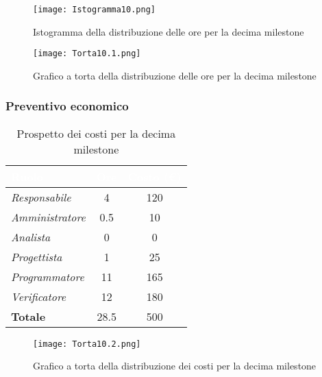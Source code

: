 \begin{figure}[H]
    \texttt{[image: Istogramma10.png]}
    \caption{Istogramma della distribuzione delle ore per la decima milestone}
\end{figure}

\begin{figure}[H]
    \texttt{[image: Torta10.1.png]}
    \caption{Grafico a torta della distribuzione delle ore per la decima milestone}
\end{figure}

\newpage
\subsubsection{Preventivo economico}

\begin{table}[H]
    \renewcommand\arraystretch{1.5}
    \centering
    \begin{tabular}{|l|c|c|}
    \hline
    \rowcolor[HTML]{036400}
    \textcolor{white}{\textbf{Ruolo}} & \multicolumn{1}{l|}{\textcolor{white}{\textbf{Ore}}} & \multicolumn{1}{l|}{\textcolor{white}{\textbf{Costo (€)}}} \\ \hline
    \rowcolor[HTML]{EFEFEF}\textit{Responsabile}   & 4    & 120    \\ \hline
    \rowcolor[HTML]{C0C0C0}\textit{Amministratore} & 0.5  & 10     \\ \hline
    \rowcolor[HTML]{EFEFEF}\textit{Analista}       & 0    & 0      \\ \hline
    \rowcolor[HTML]{C0C0C0}\textit{Progettista}    & 1    & 25     \\ \hline
    \rowcolor[HTML]{EFEFEF}\textit{Programmatore}  & 11   & 165    \\ \hline
    \rowcolor[HTML]{C0C0C0}\textit{Verificatore}   & 12   & 180    \\ \hline
    \rowcolor[HTML]{EFEFEF}\textbf{Totale}         & 28.5 & 500    \\ \hline
    \end{tabular}
    \caption{Prospetto dei costi per la decima milestone}
\end{table}

\begin{figure}[H]
    \texttt{[image: Torta10.2.png]}
    \caption{Grafico a torta della distribuzione dei costi per la decima milestone}
\end{figure}



